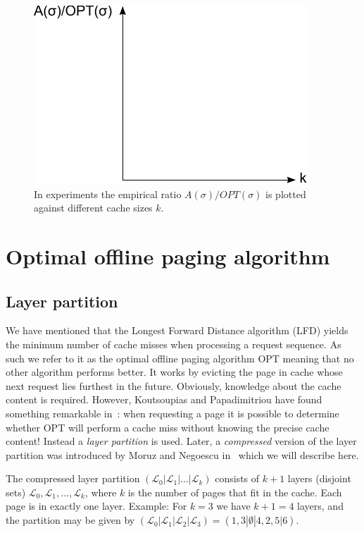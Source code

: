 \documentclass[a4paper,12pt, titlepage]{article}  %
\newcommand{\cl}{\mathcal{L}}   %
\begin{document}
\begin{figure}[ht]
	\centering
	\includegraphics[scale=1.0]{./figures/empirical_ratio.pdf}
	\caption{In experiments the empirical ratio $A(\sigma)/OPT(\sigma)$ is plotted against different cache sizes $k$.}
	\label{fig:empirical_ratio}
\end{figure}


\section{Optimal offline paging algorithm}
\subsection{Layer partition}
\label{sec:LayerPartition}
We have mentioned that the Longest Forward Distance algorithm (LFD) yields the minimum number of cache misses
when processing a request sequence. As such we refer to it as the optimal offline paging algorithm OPT meaning
that no other algorithm performs better. It works by evicting the page in cache whose next request lies furthest in the future. 
Obviously, knowledge about the cache content is required. However, Koutsoupias 
and Papadimitriou have found something remarkable in~\cite{koutsoupias00}: when requesting a page it is possible to determine whether 
OPT will perform a cache miss without knowing the precise cache content! Instead a \emph{layer partition} is used. 
Later, a \emph{compressed} version of the layer partition was introduced by Moruz and Negoescu 
in~\cite{sea12_paper} which we will describe here. 

The compressed layer partition $(\cl_0 | \cl_1 | ... | \cl_k)$ consists of $k+1$ layers (disjoint sets) $\cl_0, \cl_1, ..., \cl_k$, where $k$ is the
number of pages that fit in the cache. Each page is in exactly one layer. Example: For $k=3$ we have 
$k+1=4$ layers, and the partition may be given by $(\cl_0 | \cl_1| \cl_2| \cl_3)=(1,3|\emptyset|4,2,5|6).$   
\end{document}
